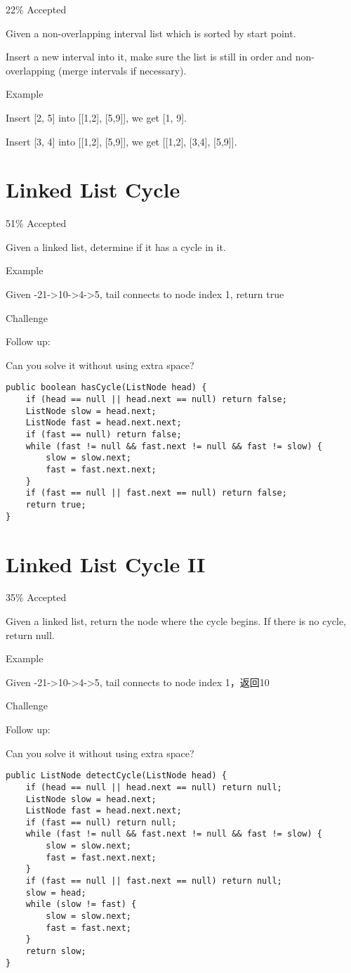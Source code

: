 \documentclass[9pt, b5paaper]{book}
\begin{document}
22\% Accepted

Given a non-overlapping interval list which is sorted by start point.

Insert a new interval into it, make sure the list is still in order and non-overlapping (merge intervals if necessary).

Example

Insert [2, 5] into [[1,2], [5,9]], we get [1, 9].

Insert [3, 4] into [[1,2], [5,9]], we get [[1,2], [3,4], [5,9]].
\section{Linked List Cycle}
\label{sec-5-35}

51\% Accepted

Given a linked list, determine if it has a cycle in it.



Example

Given -21->10->4->5, tail connects to node index 1, return true

Challenge

Follow up:

Can you solve it without using extra space?
\begin{verbatim}
public boolean hasCycle(ListNode head) {
    if (head == null || head.next == null) return false;
    ListNode slow = head.next;
    ListNode fast = head.next.next;
    if (fast == null) return false;
    while (fast != null && fast.next != null && fast != slow) {
        slow = slow.next;
        fast = fast.next.next;
    }
    if (fast == null || fast.next == null) return false;
    return true;
}
\end{verbatim}
\section{Linked List Cycle II}
\label{sec-5-36}

35\% Accepted

Given a linked list, return the node where the cycle begins. If there is no cycle, return null.

Example

Given -21->10->4->5, tail connects to node index 1，返回10

Challenge

Follow up:

Can you solve it without using extra space? 
\begin{verbatim}
public ListNode detectCycle(ListNode head) {  
    if (head == null || head.next == null) return null;
    ListNode slow = head.next;
    ListNode fast = head.next.next;
    if (fast == null) return null;
    while (fast != null && fast.next != null && fast != slow) {
        slow = slow.next;
        fast = fast.next.next;
    }
    if (fast == null || fast.next == null) return null;
    slow = head;
    while (slow != fast) {
        slow = slow.next;
        fast = fast.next;
    }
    return slow;
}
\end{verbatim}
\end{document}
